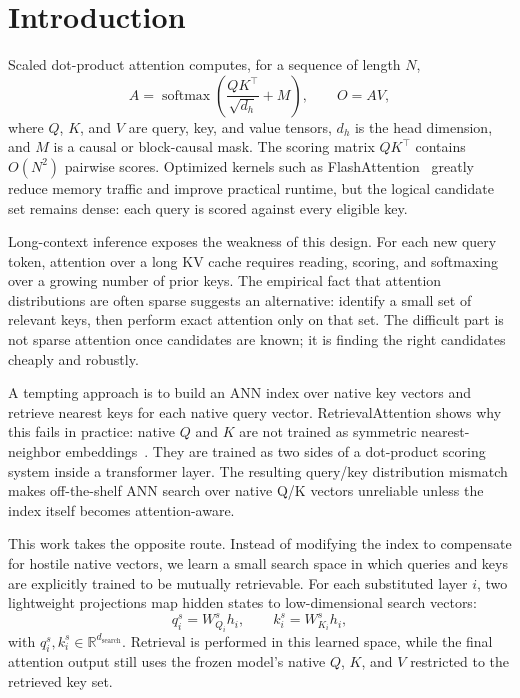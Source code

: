 \documentclass[10pt]{article}
\begin{document}
\section{Introduction}
Scaled dot-product attention computes, for a sequence of length $N$,
\begin{equation}
    A = \operatorname{softmax}\left(\frac{QK^\top}{\sqrt{d_h}} + M\right),
    \qquad O = AV,
\end{equation}
where $Q$, $K$, and $V$ are query, key, and value tensors, $d_h$ is the head
dimension, and $M$ is a causal or block-causal mask. The scoring matrix
$QK^\top$ contains $O(N^2)$ pairwise scores. Optimized kernels such as
FlashAttention~\citep{dao2022flashattention} greatly reduce memory traffic and
improve practical runtime, but the logical candidate set remains dense: each
query is scored against every eligible key.

Long-context inference exposes the weakness of this design. For each new query
token, attention over a long KV cache requires reading, scoring, and softmaxing
over a growing number of prior keys. The empirical fact that attention
distributions are often sparse suggests an alternative: identify a small set of
relevant keys, then perform exact attention only on that set. The difficult part
is not sparse attention once candidates are known; it is finding the right
candidates cheaply and robustly.

A tempting approach is to build an ANN index over native key vectors and
retrieve nearest keys for each native query vector. RetrievalAttention shows why
this fails in practice: native $Q$ and $K$ are not trained as symmetric
nearest-neighbor embeddings~\citep{retrievalattention2024}. They are trained as
two sides of a dot-product scoring system inside a transformer layer. The
resulting query/key distribution mismatch makes off-the-shelf ANN search over
native Q/K vectors unreliable unless the index itself becomes attention-aware.

This work takes the opposite route. Instead of modifying the index to compensate
for hostile native vectors, we learn a small search space in which queries and
keys are explicitly trained to be mutually retrievable. For each substituted
layer $i$, two lightweight projections map hidden states to low-dimensional
search vectors:
\begin{equation}
    q_i^s = W_{Q_i}^s h_i,\qquad k_i^s = W_{K_i}^s h_i,
\end{equation}
with $q_i^s,k_i^s\in\mathbb{R}^{d_{\mathrm{search}}}$. Retrieval is performed
in this learned space, while the final attention output still uses the frozen
model's native $Q$, $K$, and $V$ restricted to the retrieved key set.
\end{document}
